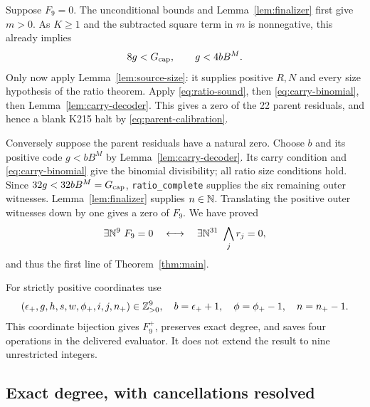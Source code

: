 Suppose $F_9=0$. The unconditional bounds and
Lemma~\ref{lem:finalizer} first give $m>0$. As $K\ge1$ and the
subtracted square term in $m$ is nonnegative, this already implies
\[
 8g<G_{\rm cap},\qquad g<4bB^M.
\]
Only now apply Lemma~\ref{lem:source-size}: it supplies positive
$R,N$ and every size hypothesis of the ratio theorem. Apply
\eqref{eq:ratio-sound}, then \eqref{eq:carry-binomial}, then
Lemma~\ref{lem:carry-decoder}. This gives a zero of the 22 parent
residuals, and hence a blank K215 halt by
\eqref{eq:parent-calibration}.

Conversely suppose the parent residuals have a natural zero. Choose
$b$ and its positive code $g<bB^M$ by
Lemma~\ref{lem:carry-decoder}. Its carry condition and
\eqref{eq:carry-binomial} give the binomial divisibility; all ratio
size conditions hold. Since $32g<32bB^M=G_{\rm cap}$,
\texttt{ratio\_complete} supplies the six remaining outer witnesses.
Lemma~\ref{lem:finalizer} supplies $n\in\mathbb N$. Translating the positive
outer witnesses down by one gives a zero of $F_9$. We have proved
\[
 \exists\mathbb N^9\ F_9=0
 \quad\longleftrightarrow\quad
 \exists\mathbb N^{31}\ \bigwedge_jr_j=0,
\]
and thus the first line of Theorem~\ref{thm:main}.

For strictly positive coordinates use
\[
 (\epsilon_+,g,h,s,w,\phi_+,i,j,n_+)\in\mathbb Z_{>0}^9,
 \quad b=\epsilon_++1,\quad\phi=\phi_+-1,\quad n=n_+-1.
\]
This coordinate bijection gives $F_9^+$, preserves exact degree,
and saves four operations in the delivered evaluator. It does not
extend the result to nine unrestricted integers.

\subsection{Exact degree, with cancellations resolved}

